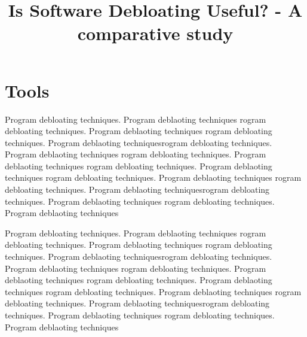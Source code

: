 \documentclass{relatorio}
\title{Is Software Debloating Useful? - A comparative study}
\begin{document}
	
	
	\maketitle{}
	
	\section{Tools}%
	\label{Tools}
	
	Program debloating techniques. Program deblaoting techniques rogram debloating techniques. Program deblaoting techniques
	rogram debloating techniques. Program deblaoting techniquesrogram debloating techniques. Program deblaoting techniques
	rogram debloating techniques. Program deblaoting techniques rogram debloating techniques. Program deblaoting techniques
	rogram debloating techniques. Program deblaoting techniques 
	rogram debloating techniques. Program deblaoting techniquesrogram debloating techniques. Program deblaoting techniques
	rogram debloating techniques. Program deblaoting techniques
	
	Program debloating techniques. Program deblaoting techniques rogram debloating techniques. Program deblaoting techniques
	rogram debloating techniques. Program deblaoting techniquesrogram debloating techniques. Program deblaoting techniques
	rogram debloating techniques. Program deblaoting techniques rogram debloating techniques. Program deblaoting techniques
	rogram debloating techniques. Program deblaoting techniques 
	rogram debloating techniques. Program deblaoting techniquesrogram debloating techniques. Program deblaoting techniques
	rogram debloating techniques. Program deblaoting techniques
	
\end{document}
